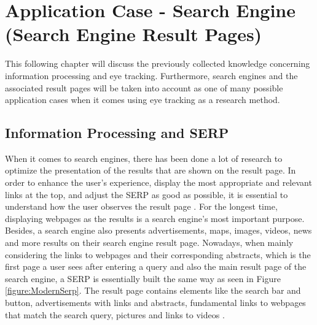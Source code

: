 \section{Application Case - Search Engine (Search Engine Result Pages)}
\label{section:SearchEngine}
This following chapter will discuss the previously collected knowledge concerning information processing and eye tracking. Furthermore, search engines and the associated result pages will be taken into account as one of many possible application cases when it comes using eye tracking as a research method.
\subsection{Information Processing and SERP}
\label{subsection:ReadingSERP}
When it comes to search engines, there has been done a lot of research to optimize the presentation of the results that are shown on the result page.  In order to enhance the user's experience, display the most appropriate and relevant links at the top, and adjust the SERP as good as possible, it is essential to understand how the user observes the result page \autocite{buscher2010good, liu2015influence}.
For the longest time, displaying webpages as the results is a search engine's most important purpose. Besides, a search engine also presents advertisements, maps, images, videos, news and more results on their search engine result page. Nowadays, when mainly considering the links to webpages and their corresponding abstracts, which is the first page a user sees after entering a query and also the main result page of the search engine, a SERP is essentially built the same way as seen in Figure \ref{figure:ModernSerp}.
The result page contains elements like the search bar and button, advertisements with links and abstracts, fundamental links to webpages that match the search query, pictures and links to videos \autocite{wang2016beyond}.

